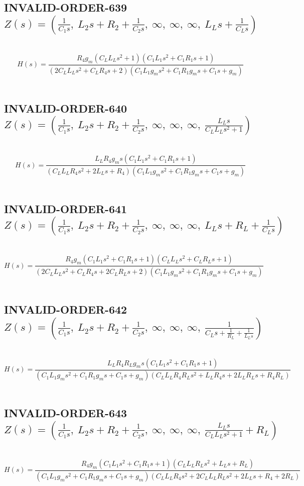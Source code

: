 \documentclass{article}
\begin{document}
\subsection{INVALID-ORDER-639 $Z(s) = \left( \frac{1}{C_{1} s}, \  L_{2} s + R_{2} + \frac{1}{C_{2} s}, \  \infty, \  \infty, \  \infty, \  L_{L} s + \frac{1}{C_{L} s}\right)$ } \ 
\textbf{\[H(s) = \frac{R_{4} g_{m} \left(C_{L} L_{L} s^{2} + 1\right) \left(C_{1} L_{1} s^{2} + C_{1} R_{1} s + 1\right)}{\left(2 C_{L} L_{L} s^{2} + C_{L} R_{4} s + 2\right) \left(C_{1} L_{1} g_{m} s^{2} + C_{1} R_{1} g_{m} s + C_{1} s + g_{m}\right)}\] } \ 
\subsection{INVALID-ORDER-640 $Z(s) = \left( \frac{1}{C_{1} s}, \  L_{2} s + R_{2} + \frac{1}{C_{2} s}, \  \infty, \  \infty, \  \infty, \  \frac{L_{L} s}{C_{L} L_{L} s^{2} + 1}\right)$ } \ 
\textbf{\[H(s) = \frac{L_{L} R_{4} g_{m} s \left(C_{1} L_{1} s^{2} + C_{1} R_{1} s + 1\right)}{\left(C_{L} L_{L} R_{4} s^{2} + 2 L_{L} s + R_{4}\right) \left(C_{1} L_{1} g_{m} s^{2} + C_{1} R_{1} g_{m} s + C_{1} s + g_{m}\right)}\] } \ 
\subsection{INVALID-ORDER-641 $Z(s) = \left( \frac{1}{C_{1} s}, \  L_{2} s + R_{2} + \frac{1}{C_{2} s}, \  \infty, \  \infty, \  \infty, \  L_{L} s + R_{L} + \frac{1}{C_{L} s}\right)$ } \ 
\textbf{\[H(s) = \frac{R_{4} g_{m} \left(C_{1} L_{1} s^{2} + C_{1} R_{1} s + 1\right) \left(C_{L} L_{L} s^{2} + C_{L} R_{L} s + 1\right)}{\left(2 C_{L} L_{L} s^{2} + C_{L} R_{4} s + 2 C_{L} R_{L} s + 2\right) \left(C_{1} L_{1} g_{m} s^{2} + C_{1} R_{1} g_{m} s + C_{1} s + g_{m}\right)}\] } \ 
\subsection{INVALID-ORDER-642 $Z(s) = \left( \frac{1}{C_{1} s}, \  L_{2} s + R_{2} + \frac{1}{C_{2} s}, \  \infty, \  \infty, \  \infty, \  \frac{1}{C_{L} s + \frac{1}{R_{L}} + \frac{1}{L_{L} s}}\right)$ } \ 
\textbf{\[H(s) = \frac{L_{L} R_{4} R_{L} g_{m} s \left(C_{1} L_{1} s^{2} + C_{1} R_{1} s + 1\right)}{\left(C_{1} L_{1} g_{m} s^{2} + C_{1} R_{1} g_{m} s + C_{1} s + g_{m}\right) \left(C_{L} L_{L} R_{4} R_{L} s^{2} + L_{L} R_{4} s + 2 L_{L} R_{L} s + R_{4} R_{L}\right)}\] } \ 
\subsection{INVALID-ORDER-643 $Z(s) = \left( \frac{1}{C_{1} s}, \  L_{2} s + R_{2} + \frac{1}{C_{2} s}, \  \infty, \  \infty, \  \infty, \  \frac{L_{L} s}{C_{L} L_{L} s^{2} + 1} + R_{L}\right)$ } \ 
\textbf{\[H(s) = \frac{R_{4} g_{m} \left(C_{1} L_{1} s^{2} + C_{1} R_{1} s + 1\right) \left(C_{L} L_{L} R_{L} s^{2} + L_{L} s + R_{L}\right)}{\left(C_{1} L_{1} g_{m} s^{2} + C_{1} R_{1} g_{m} s + C_{1} s + g_{m}\right) \left(C_{L} L_{L} R_{4} s^{2} + 2 C_{L} L_{L} R_{L} s^{2} + 2 L_{L} s + R_{4} + 2 R_{L}\right)}\] } \ 
\end{document}
